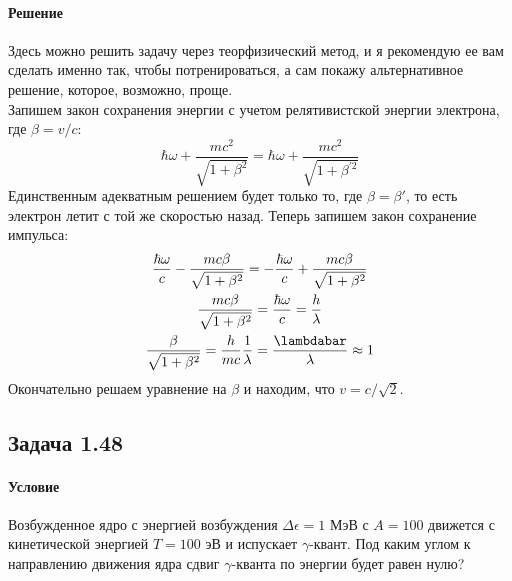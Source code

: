 \documentclass[12pt]{article}
\begin{document}
\paragraph{Решение}
Здесь можно решить задачу через теорфизический метод, и я рекомендую ее вам сделать именно так, чтобы потренироваться, а сам покажу альтернативное решение, которое, возможно, проще.
\\
Запишем закон сохранения энергии с учетом релятивистской энергии электрона, где $\beta = v/c$:
\begin{equation*}
    \hbar\omega + \dfrac{mc^2}{\sqrt{1+\beta^2}}=\hbar\omega + \dfrac{mc^2}{\sqrt{1+\beta^{'2}}}
\end{equation*}
Единственным адекватным решением будет только то, где $\beta = \beta'$, то есть электрон летит с той же скоростью назад. Теперь запишем закон сохранение импульса:
\begin{gather*}
    \dfrac{\hbar\omega}{c} - \dfrac{mc\beta}{\sqrt{1+\beta^2}} = -\dfrac{\hbar\omega}{c} + \dfrac{mc\beta}{\sqrt{1+\beta^2}}\\
     \dfrac{mc\beta}{\sqrt{1+\beta^2}} = \dfrac{\hbar\omega}{c} = \dfrac{h}{\lambda}\\
     \dfrac{\beta}{\sqrt{1+\beta^2}} = \dfrac{h}{mc}\dfrac{1}{\lambda} = \dfrac{\lambdabar}{\lambda}\approx 1\\
\end{gather*}
Окончательно решаем уравнение на $\beta$ и находим, что $v = c/\sqrt{2}$.

\subsection{Задача 1.48}
\label{task_148}
\paragraph{Условие} Возбужденное ядро с энергией возбуждения $\Delta \epsilon = 1 $ МэВ с $A = 100$ движется с кинетической энергией $T = 100$ эВ и испускает $\gamma$-квант. Под каким углом к направлению движения ядра сдвиг $\gamma$-кванта по энергии будет равен нулю?
\end{document}

